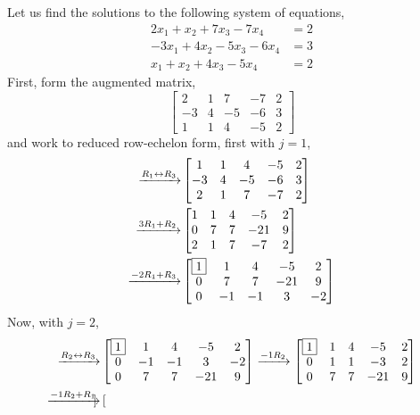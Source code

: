 \documentclass{ximera}
\begin{document}
\begin{example}
Let us find the solutions to the following system of equations,
\begin{align*}
2x_1  + x_2 + 7x_3 - 7x_4 &= 2 \\
-3x_1 + 4x_2 -5x_3 - 6x_4 &=  3 \\
x_1 +x_2 + 4x_3 - 5x_4 &=  2
\end{align*}
First, form the augmented matrix,
\[
\begin{bmatrix}
2 & 1 & 7 & -7 & 2\\
-3 & 4 &  -5 & -6 &  3\\
1 & 1 & 4 &  -5 & 2
\end{bmatrix}
\]
and work to reduced row-echelon form, first with $j=1$,
\begin{align*}
\xrightarrow{R_{1}\leftrightarrow R_{3}}
&
\begin{bmatrix}
1 & 1 & 4 &  -5 & 2\\
-3 & 4 &  -5 & -6 &  3\\
2 & 1 & 7 & -7 & 2
\end{bmatrix} \\
\xrightarrow{3R_{1}+R_{2}} &
\begin{bmatrix}
1 & 1 & 4 &  -5 & 2\\
0 & 7 &  7 & -21 &  9\\
2 & 1 & 7 & -7 & 2
\end{bmatrix}\\
\xrightarrow{-2R_{1}+R_{3}} &
\begin{bmatrix}
\fbox{1} & 1 & 4 &  -5 & 2\\
0 & 7 &  7 & -21 &  9\\
0 & -1 & -1 & 3 & -2
\end{bmatrix} 
\end{align*}
Now, with $j=2$,
\begin{align*}
\xrightarrow{R_{2}\leftrightarrow R_{3}}
&
\begin{bmatrix}
\fbox{1} & 1 & 4 &  -5 & 2\\
0 & -1 & -1 & 3 & -2\\
0 & 7 &  7 & -21 &  9
\end{bmatrix}
\xrightarrow{-1R_{2}}
\begin{bmatrix}
\fbox{1} & 1 & 4 &  -5 & 2\\
0 & 1 & 1 & -3 & 2\\
0 & 7 &  7 & -21 &  9
\end{bmatrix}\\
\xrightarrow{-1R_{2}+R_{1}}
&
\begin{bmatrix}

\end{bmatrix}
\end{align*}
\end{example}
\end{document}
